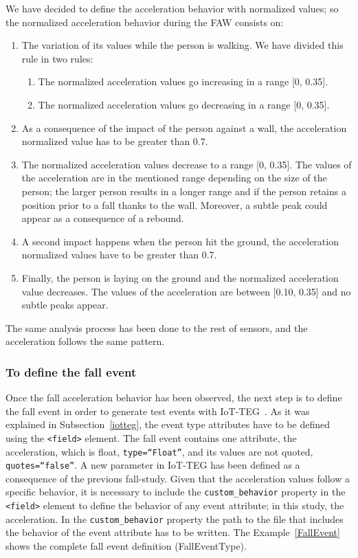 \documentclass[10pt,journal,compsoc]{IEEEtran}
\begin{document}
We have decided to define the acceleration behavior with normalized values; so the normalized acceleration behavior during the FAW consists on:
\begin{enumerate}
	\item The variation of its values while the person is walking. We have divided this rule in two rules:
	\begin{enumerate}
		\item The normalized acceleration values go increasing in a range [0, 0.35].
		\item The normalized acceleration values go decreasing in a range [0, 0.35].
	\end{enumerate}
	\item As a consequence of the impact of the person against a wall, the acceleration normalized value has to be greater than 0.7.
	\item The normalized acceleration values decrease to a range [0, 0.35]. The values of the acceleration are in the mentioned range depending on the size of the person; the larger person results in a longer range and if the person retains a position prior to a fall thanks to the wall. Moreover, a subtle peak could appear as a consequence of a rebound.
	\item A second impact happens when the person hit the ground, the acceleration normalized values have to be greater than 0.7.
	\item Finally, the person is laying on the ground and the normalized acceleration value decreases. The values of the acceleration are between [0.10, 0.35] and no subtle peaks appear. 
\end{enumerate}
The same analysis process has been done to the rest of sensors, and the acceleration follows the same pattern.

\subsubsection{To define the fall event} Once the fall acceleration behavior has been observed, the next step is to define the 
fall event in order to generate test events with IoT-TEG~\cite{TesisGutierrez2017,Gutierrez2017}. As it was explained in 
Subsection~\ref{iotteg}, the event type attributes have
to be defined using the \texttt{<field>} element. The fall event contains one attribute, the acceleration, which is float, 
\texttt{type=``Float''}, and its values are not quoted, \texttt{quotes=``false''}. A new parameter in IoT-TEG has been defined as a 
consequence of the previous fall-study. Given that the acceleration values follow a specific behavior, it is necessary to include 
the \texttt{custom\_behavior} property in the \texttt{<field>} element to define the behavior of any event attribute; 
in this study, the acceleration. In the \texttt{custom\_behavior} property the path to the file that includes the behavior of the 
event attribute has to be written. The Example~\ref{FallEvent} shows the complete fall event definition (FallEventType).
\end{document}
